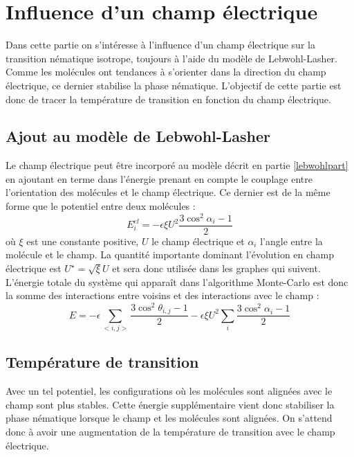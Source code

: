 \documentclass[11pt,a4paper]{article}
\numberwithin{equation}{section}
\begin{document}
\newpage
\section{Influence d'un champ électrique}


Dans cette partie on s'intéresse à l'influence d'un champ électrique sur la transition nématique isotrope, toujours à l'aide du modèle de Lebwohl-Lasher. Comme les molécules ont tendances à s'orienter dans la direction du champ électrique, ce dernier stabilise la phase nématique. L'objectif de cette partie est donc de tracer la température de transition en fonction du champ électrique.
\subsection{Ajout au modèle de Lebwohl-Lasher}
Le champ électrique peut être incorporé au modèle décrit en partie \ref{lebwohlpart} en ajoutant en terme dans l'énergie prenant en compte le couplage entre l'orientation des molécules et le champ électrique. Ce dernier est de la même forme que le potentiel entre deux molécules \cite{entropicelectric,electric3, biolo}:
\begin{equation}
E_{i}^{el} = - \epsilon \xi U^2 \frac{3\cos^2\alpha_i-1}{2}
\label{interactfield}
\end{equation}
où $\xi$ est une constante positive, $U$ le champ électrique et $\alpha_{i}$ l'angle entre la molécule et le champ. La quantité importante dominant l'évolution en champ électrique est $U^\star = \sqrt{\xi} U$ et sera donc utilisée dans les graphes qui suivent. L'énergie totale du système qui apparaît dans l'algorithme Monte-Carlo est donc la somme des interactions entre voisins et des interactions avec le champ :
\begin{equation}
E = - \epsilon\sum_{<i,j>} \frac{3\cos^2\theta_{i,j}-1}{2} - \epsilon \xi U^2 \sum_{i}\frac{3\cos^2\alpha_i-1}{2}
\end{equation}

\subsection{Température de transition}
Avec un tel potentiel, les configurations où les molécules sont alignées avec le champ sont plus stables. Cette énergie supplémentaire vient donc stabiliser la phase nématique lorsque le champ et les molécules sont alignées. On s'attend donc à avoir une augmentation de la température de transition avec le champ électrique.
\end{document}
